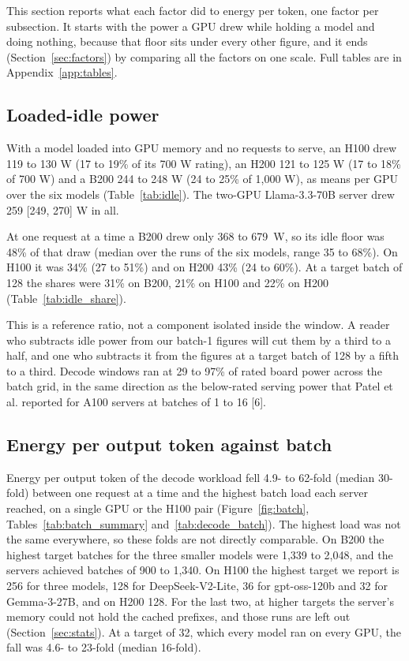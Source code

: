 \documentclass[11pt]{article}
\begin{document}
This section reports what each factor did to energy per token, one factor per subsection. It starts with the power a GPU drew while holding a model and doing nothing, because that floor sits under every other figure, and it ends (Section~\ref{sec:factors}) by comparing all the factors on one scale. Full tables are in Appendix~\ref{app:tables}.

\subsection{Loaded-idle power}\label{sec:idle}

With a model loaded into GPU memory and no requests to serve, an H100 drew 119 to 130 W (17 to 19\% of its 700 W rating), an H200 121 to 125 W (17 to 18\% of 700 W) and a B200 244 to 248 W (24 to 25\% of 1,000 W), as means per GPU over the six models (Table~\ref{tab:idle}). The two-GPU Llama-3.3-70B server drew 259 [249, 270] W in all.

At one request at a time a B200 drew only 368 to 679~W, so its idle floor was 48\% of that draw (median over the runs of the six models, range 35 to 68\%). On H100 it was 34\% (27 to 51\%) and on H200 43\% (24 to 60\%). At a target batch of 128 the shares were 31\% on B200, 21\% on H100 and 22\% on H200 (Table~\ref{tab:idle_share}).

This is a reference ratio, not a component isolated inside the window. A reader who subtracts idle power from our batch-1 figures will cut them by a third to a half, and one who subtracts it from the figures at a target batch of 128 by a fifth to a third. Decode windows ran at 29 to 97\% of rated board power across the batch grid, in the same direction as the below-rated serving power that Patel et al. reported for A100 servers at batches of 1 to 16 [6].

\subsection{Energy per output token against batch}\label{sec:batch}

Energy per output token of the decode workload fell 4.9- to 62-fold (median 30-fold) between one request at a time and the highest batch load each server reached, on a single GPU or the H100 pair (Figure~\ref{fig:batch}, Tables~\ref{tab:batch_summary} and~\ref{tab:decode_batch}). The highest load was not the same everywhere, so these folds are not directly comparable. On B200 the highest target batches for the three smaller models were 1,339 to 2,048, and the servers achieved batches of 900 to 1,340. On H100 the highest target we report is 256 for three models, 128 for DeepSeek-V2-Lite, 36 for gpt-oss-120b and 32 for Gemma-3-27B, and on H200 128. For the last two, at higher targets the server's memory could not hold the cached prefixes, and those runs are left out (Section~\ref{sec:stats}). At a target of 32, which every model ran on every GPU, the fall was 4.6- to 23-fold (median 16-fold).
\end{document}
